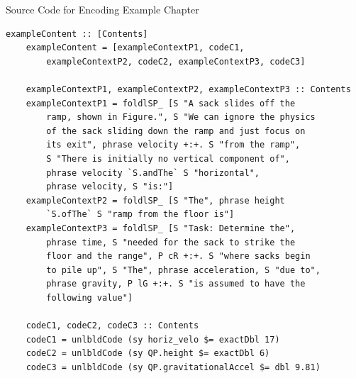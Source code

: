 \begin{listing}[h!]
	\caption{Source Code for Encoding Example Chapter}
	\label{code:encodeExample}
	\begin{lstlisting}[language=haskell1]
	exampleContent :: [Contents]
	exampleContent = [exampleContextP1, codeC1, 
		exampleContextP2, codeC2, exampleContextP3, codeC3]
		
	exampleContextP1, exampleContextP2, exampleContextP3 :: Contents
	exampleContextP1 = foldlSP_ [S "A sack slides off the
		ramp, shown in Figure.", S "We can ignore the physics 
		of the sack sliding down the ramp and just focus on 
		its exit", phrase velocity +:+. S "from the ramp",
		S "There is initially no vertical component of", 
		phrase velocity `S.andThe` S "horizontal", 
		phrase velocity, S "is:"]
	exampleContextP2 = foldlSP_ [S "The", phrase height 
		`S.ofThe` S "ramp from the floor is"]
	exampleContextP3 = foldlSP_ [S "Task: Determine the", 
		phrase time, S "needed for the sack to strike the 
		floor and the range", P cR +:+. S "where sacks begin 
		to pile up", S "The", phrase acceleration, S "due to", 
		phrase gravity, P lG +:+. S "is assumed to have the 
		following value"]
		
	codeC1, codeC2, codeC3 :: Contents
	codeC1 = unlbldCode (sy horiz_velo $= exactDbl 17)
	codeC2 = unlbldCode (sy QP.height $= exactDbl 6)
	codeC3 = unlbldCode (sy QP.gravitationalAccel $= dbl 9.81)
	\end{lstlisting}
\end{listing}